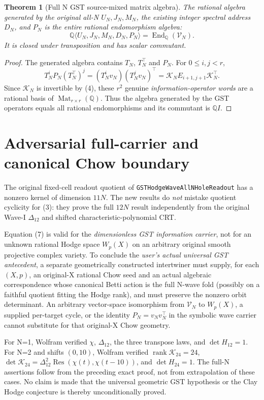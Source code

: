 \documentclass[11pt]{article}
\newtheorem{theorem}{Theorem}
\newcommand{\Q}{\mathbb Q}
\newcommand{\End}{\operatorname{End}}
\newcommand{\Res}{\operatorname{Res}}
\begin{document}
\begin{theorem}[Full N GST source-mixed matrix algebra]
The rational algebra generated by the original all-N $U_N,J_N,M_N$, the existing integer spectral address $D_N$, and $P_N$ is the \emph{entire rational endomorphism algebra}:
\[
 \boxed{
 \Q\langle U_N,J_N,M_N,D_N,P_N\rangle
 =\End_\Q(\mathscr V_N).}\tag{7}
\]
It is closed under transposition and has scalar commutant.
\end{theorem}
\begin{proof}
The generated algebra contains $T_N$, $T_N^\top$ and $P_N$.
For $0\le i,j<r$,
\[
 \boxed{
 T_N^iP_N(T_N^\top)^j
   =(T_N^iv_N)(T_N^jv_N)^\top
   =\mathcal K_N E_{i+1,j+1}\mathcal K_N^\top.}\tag{8}
\]
Since $\mathcal K_N$ is invertible by (4), these $r^2$ genuine
\emph{information-operator words} are a rational basis of
$\operatorname{Mat}_{r\times r}(\Q)$. Thus the algebra generated by the GST operators equals all rational endomorphisms and its commutant is $\Q I$.
\end{proof}

\section{Adversarial full-carrier and canonical Chow boundary}
The original fixed-cell readout quotient of \texttt{GSTHodgeWaveAllNHoleReadout} has a nonzero kernel of dimension $11N$. The new results do \emph{not} mistake quotient cyclicity for (3): they prove the full $12N$ result independently from the original Wave-I $\Delta_{12}$ and shifted characteristic-polynomial CRT.

Equation (7) is valid for the \emph{dimensionless GST information carrier}, not for an unknown rational Hodge space $W_p(X)$ on an arbitrary original smooth projective complex variety. To conclude the \emph{user's actual universal GST antecedent}, a separate geometrically constructed intertwiner must supply, for each $(X,p)$, an original-X rational Chow seed and an actual algebraic correspondence whose canonical Betti action is the full N-wave fold (possibly on a faithful quotient fitting the Hodge rank), and must preserve the nonzero orbit determinant. An arbitrary vector-space isomorphism from $\mathscr V_N$ to $W_p(X)$, a supplied per-target cycle, or the identity $P_N=v_Nv_N^\top$ in the symbolic wave carrier cannot substitute for that original-X Chow geometry.

For N=1, Wolfram verified $\chi$, $\Delta_{12}$, the three transpose laws, and $\det H_{12}=1$. For N=2 and shifts $(0,10)$, Wolfram verified $\operatorname{rank}\mathcal K_{24}=24$,
\(\det\mathcal K_{24}=\Delta_{12}^2\Res(\chi(t),\chi(t-10))\), and $\det H_{24}=1$. The full-N assertions follow from the preceding exact proof, not from extrapolation of these cases.
No claim is made that the universal geometric GST hypothesis or the Clay Hodge conjecture is thereby unconditionally proved.
\end{document}
